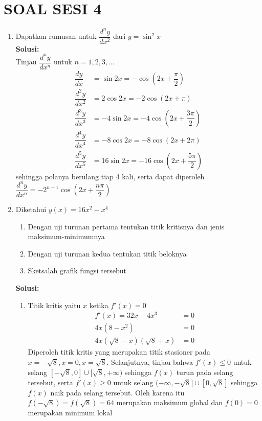 \documentclass{article}
\begin{document}
\section*{SOAL SESI 4}
\begin{enumerate}
	\item Dapatkan rumusan untuk $\dfrac{d^ny}{dx^2}$ dari $y=\sin^2x$
	\\[0.2 cm] \textbf{Solusi:}\\
	Tinjau $\dfrac{d^ny}{dx^n}$ untuk $n=1,2,3,...$
	\begin{align*}
	\dfrac{dy}{dx} &= \sin 2x = - \cos \left(2x+\dfrac{\pi}{2}\right)\\
	\dfrac{d^2y}{dx^2} &= 2\cos 2x = -2\cos(2x+\pi)\\
	\dfrac{d^3y}{dx^3} &= -4\sin 2x = -4\cos\left(2x+\dfrac{3\pi}{2}\right)  \\
	\dfrac{d^4y}{dx^4} &= -8\cos 2x = -8\cos(2x+2\pi) \\
	\dfrac{d^5y}{dx^5} &= 16\sin 2x = -16\cos\left(2x+\dfrac{5\pi}{2}\right)
	\end{align*}
	sehingga polanya berulang tiap 4 kali, serta dapat  diperoleh $\dfrac{d^ny}{dx^n} = -2^{n-1}\cos\left(2x+\dfrac{n\pi}{2}\right)$
	\item Diketahui $y(x)=16x^2-x^4$
	\begin{enumerate}
		\item Dengan uji turunan pertama tentukan titik kritisnya dan jenis maksimum-minimumnya
		\item Dengan uji turunan kedua tentukan titik beloknya
		\item Sketsalah grafik fungsi tersebut
	\end{enumerate}
	\textbf{Solusi:}
	\begin{enumerate}
		\item Titik kritis yaitu $x$ ketika $f'(x)=0$
		\begin{align*}
		f'(x) = 32x-4x^3 &= 0\\
		4x(8-x^2) &= 0\\
		4x(\sqrt{8}-x)(\sqrt{8}+x) &= 0
		\end{align*}
		Diperoleh titik kritis yang merupakan titik stasioner pada $x=-\sqrt{8},x=0,x=\sqrt{8}$. Selanjutnya, tinjau bahwa $f'(x)\leq 0$ untuk selang $[-\sqrt{8},0] \cup [\sqrt{8},+\infty)$ sehingga $f(x)$ turun pada selang tersebut, serta $f'(x)\geq 0$ untuk selang $(-\infty,-\sqrt{8}]\cup[0,\sqrt{8}]$ sehingga $f(x)$ naik pada selang tersebut. Oleh karena itu $f(-\sqrt{8})=f(\sqrt{8})=64$ merupakan maksimum global dan $f(0)=0$ merupakan minimum lokal

\end{enumerate}
\end{enumerate}
\end{document}
